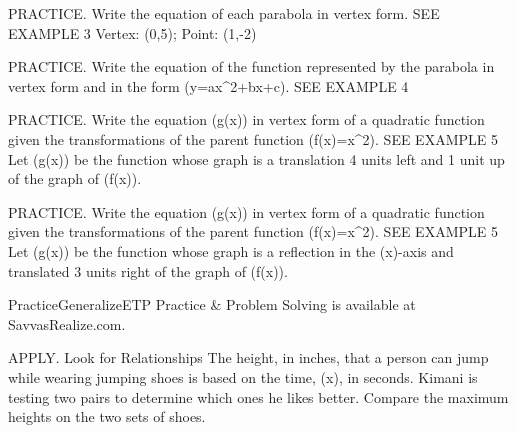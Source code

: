 \documentclass{article}
\newenvironment{practice}[2]{}{}        %
\newenvironment{te-addendum}[2]{}{}     %
\newcommand{\answer}[1]{}               %
\newcommand{\placeholder}[2]{}          %
\newcommand{\te}[1]{}                   %
\begin{document}
\begin{practice}{28}{1}
PRACTICE. Write the equation of each parabola in vertex form. SEE EXAMPLE 3
Vertex: (0,5); Point: (1,-2)
\answer{(y=-7x^2+5)}
\end{practice}
\begin{practice}{29}{1}
PRACTICE. Write the equation of the function represented by the parabola in vertex form and in the form (y=ax^2+bx+c). SEE EXAMPLE 4
\placeholder{graph}{Practice 29: red upward parabola y=2(x+1)^2-6, closed vertex labeled (-1,-6), y-intercept (0,-4); gray x,y axes, unit grid window x=-7 to 5,y=-7 to 5, x labels -6,-4,-2,2,4, y labels -6,-4,-2,2,4, origin O; arrowheads at top of both branches.}
\answer{(y=2(x+1)^2-6); (y=2x^2+4x-4)}
\end{practice}
\begin{practice}{30}{1}
PRACTICE. Write the equation (g(x)) in vertex form of a quadratic function given the transformations of the parent function (f(x)=x^2). SEE EXAMPLE 5
Let (g(x)) be the function whose graph is a translation 4 units left and 1 unit up of the graph of (f(x)).
\answer{(g(x)=(x+4)^2+1)}
\end{practice}
\begin{practice}{31}{1}
PRACTICE. Write the equation (g(x)) in vertex form of a quadratic function given the transformations of the parent function (f(x)=x^2). SEE EXAMPLE 5
Let (g(x)) be the function whose graph is a reflection in the (x)-axis and translated 3 units right of the graph of (f(x)).
\answer{(g(x)=-(x-3)^2)}
\end{practice}
\begin{te-addendum}{Practice}{GeneralizeETP}
Practice & Problem Solving is available at SavvasRealize.com.
\te{The answers for practice 18--25 are printed in the left margin of this page and are placed with their items above.}
\end{te-addendum}
\begin{practice}{32}{2}
APPLY. Look for Relationships The height, in inches, that a person can jump while wearing jumping shoes is based on the time, (x), in seconds. Kimani is testing two pairs to determine which ones he likes better. Compare the maximum heights on the two sets of shoes.
\placeholder{illustration}{Two pairs of spring jumping shoes shown on blue-trousered legs against yellow circles; left yellow shoes labeled Max Jumps: f(x)=-192(x-0.289)^2+16; right green shoes labeled Jumpsters: g(x)=-192(x-0.445)^2+38.}
\answer{The maximum height for the shoes on the left is 16 in. The maximum height for the shoes on the right is 38 in. There is a 22-inch difference in the maximum heights.}
\end{practice}
\end{document}
